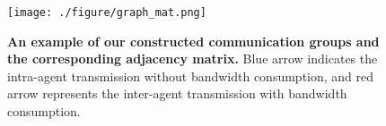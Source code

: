 \begin{figure}[t]
    \vspace{1mm}
    \begin{center}
    \centerline{\texttt{[image: ./figure/graph\_mat.png]}}
    \caption{
        \textbf{An example of our constructed communication groups and the corresponding adjacency matrix.} Blue arrow indicates the intra-agent transmission without bandwidth consumption, and red arrow represents the inter-agent transmission with bandwidth consumption.}
        \label{fig:graph_mat}

    \end{center}
    \vspace{-6mm}
\end{figure}